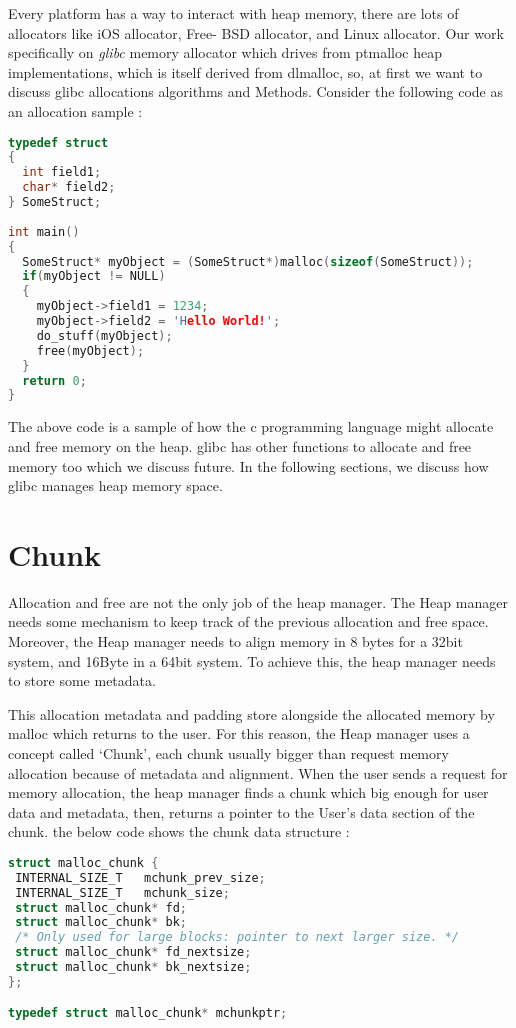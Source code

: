 \documentclass{masterthesis}
\newcommand*\libc{glibc}
\begin{document}
Every platform has a way to interact with heap memory, there are lots of allocators like iOS allocator, Free- BSD allocator, and Linux allocator. Our work specifically on \emph{ \libc{}} memory allocator which drives from ptmalloc heap implementations, which is itself derived from dlmalloc, so, at first we want to discuss \libc{} allocations algorithms and Methods. Consider the following code as an allocation sample : 

\begin{lstlisting}[language=c,frame=tlrb]
typedef struct 
{
  int field1;
  char* field2;
} SomeStruct;
 
int main()
{
  SomeStruct* myObject = (SomeStruct*)malloc(sizeof(SomeStruct));
  if(myObject != NULL)
  {
    myObject->field1 = 1234;
    myObject->field2 = 'Hello World!';
    do_stuff(myObject);
	free(myObject);
  }
  return 0;
}

\end{lstlisting}

The above code is a sample of how the c programming language might allocate and free memory on the heap. \libc{} has other functions to allocate and free memory too which we discuss future. In the following sections, we discuss how \libc{} manages heap memory space. 

\section{Chunk}

Allocation and free are not the only job of the heap manager. The Heap manager needs some mechanism to keep track of the previous allocation and free space. Moreover, the Heap manager needs to align memory in 8 bytes for a 32bit system, and 16Byte in a 64bit system. To achieve this, the heap manager needs to store some metadata.

This allocation metadata and padding store alongside the allocated memory by malloc which returns to the user. For this reason, the Heap manager uses a concept called ‘Chunk’, each chunk usually bigger than request memory allocation because of metadata and alignment. When the user sends a request for memory allocation, the heap manager finds a chunk which big enough for user data and metadata, then, returns a pointer to the User's data section of the chunk. the below code shows the chunk data structure :

\begin{lstlisting}[language=c,frame=tlrb]
struct malloc_chunk {
 INTERNAL_SIZE_T   mchunk_prev_size; 
 INTERNAL_SIZE_T   mchunk_size;
 struct malloc_chunk* fd; 
 struct malloc_chunk* bk;
 /* Only used for large blocks: pointer to next larger size. */
 struct malloc_chunk* fd_nextsize;
 struct malloc_chunk* bk_nextsize;
};

typedef struct malloc_chunk* mchunkptr;
\end{lstlisting}
\end{document}
